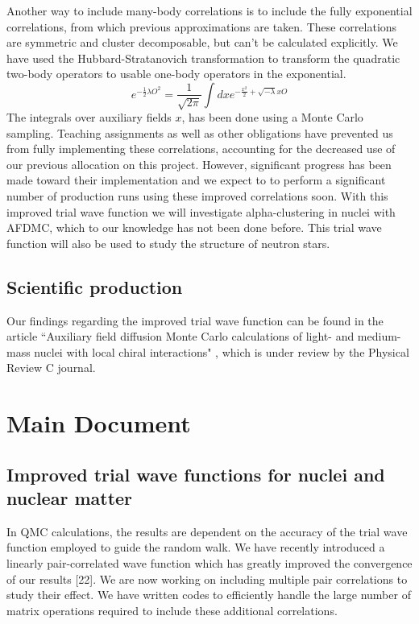 \documentclass[12pt,letterpaper]{article}
\begin{document}
Another way to include many-body correlations is to include the fully exponential correlations, from which previous approximations are taken. These correlations are symmetric and cluster decomposable, but can't be calculated explicitly. We have used the Hubbard-Stratanovich transformation to transform the quadratic two-body operators to usable one-body operators in the exponential.
\begin{equation}
   e^{-\frac{1}{2}\lambda O^2} = \frac{1}{\sqrt{2\pi}} \int dx e^{-\frac{x^2}{2} + \sqrt{-\lambda}x O}
\end{equation}
The integrals over auxiliary fields $x$, has been done using a Monte Carlo sampling. Teaching assignments as well as other obligations have prevented us from fully implementing these correlations, accounting for the decreased use of our previous allocation on this project. However, significant progress has been made toward their implementation and we expect to to perform a significant number of production runs using these improved correlations soon. With this improved trial wave function we will investigate alpha-clustering in nuclei with AFDMC, which to our knowledge has not been done before. This trial wave function will also be used to study the structure of neutron stars.

\vspace{-0.5cm}
\subsection{Scientific production}
Our findings regarding the improved trial wave function can be found in the article
``Auxiliary field diffusion Monte Carlo calculations of light- and medium-mass nuclei 
with local chiral interactions" \cite{lon18}, which is under review by the Physical
Review C journal.

\section{Main Document}
\subsection{Improved trial wave functions for nuclei and nuclear matter}
In QMC calculations, the results are dependent on the accuracy of the trial wave function employed to guide the random walk. We have recently introduced a linearly pair-correlated wave function which has greatly improved the convergence of our results [22]. We are now working on including multiple pair correlations to study their effect. We have written codes to efficiently handle the large number of matrix operations required to include these additional correlations.
\end{document}
